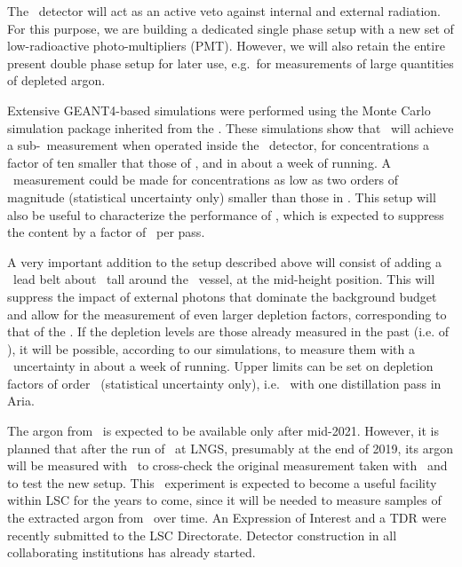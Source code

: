The \ArDM\ detector will act as an active veto against internal and external radiation. For this purpose, we are building a dedicated single phase setup with a new set of low-radioactive photo-multipliers (PMT). However, we will also retain the entire present double phase setup for later use, e.g.~for measurements of large quantities of depleted argon.

Extensive GEANT4-based simulations were performed using the Monte Carlo simulation package inherited from the \DSf.  These simulations show that  \DArT\  will  achieve a sub-\DArTUArPercentErrorWithoutLeadWithDepletionTen\ measurement when operated inside the \ArDM\ detector, for  concentrations a factor of ten smaller that those of \AAr, and in about a week of running.  A \DArTUArPercentErrorWithoutLeadWithDepletionHundred\ measurement could be made for  concentrations as low as two orders of magnitude (statistical uncertainty only) smaller than those in \AAr. This setup will also be useful to characterize the performance of \Aria, which is expected to suppress the  content by a factor of \AriaDepletionPerPass\ per pass.  

A very important addition to the setup described above will consist of adding a \DArTLeadBeltMass\ lead belt about \DArTLeadBeltHeight\ tall around the \ArDM\ vessel, at the mid-height position.  This will suppress the impact of external photons that dominate the background budget and allow for the measurement of even larger  depletion factors, corresponding to that of the \UAr.  If the depletion levels are those already measured in the past (i.e. of \DSfUArDepletion), it will be possible, according to our simulations, to measure them with a \DArTUArPercentErrorWithLead\ uncertainty in about a week of running. Upper limits can be set on depletion factors of order \DArTUArDepletionWithLead\ (statistical uncertainty only), i.e. \UAr\ with one  distillation pass in Aria.

The argon from \Urania\ is expected to be available only after mid-2021. However, it is planned that after the run of \DSfs\ at LNGS, presumably at the end of 2019, its argon will be measured with \DArT\ to cross-check the original measurement taken with \DSfs\ and to test the new setup. This  \DArT\  experiment is expected to become a useful facility within LSC for the years to come, since it will be needed to measure samples of the extracted argon from \Urania\ over time.  An Expression of Interest and a TDR were recently submitted to the LSC Directorate. Detector construction in all collaborating institutions has already started.   